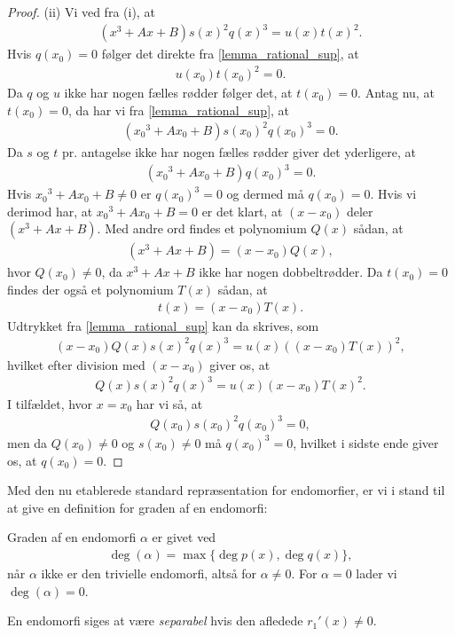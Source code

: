 \begin{proof}
(ii) Vi ved fra (i), at 
\begin{align}
	\label{lemma_rational_sup}
	(x^3 + Ax + B)s(x)^2 q(x)^3 = u(x) t(x)^2.
\end{align}
Hvis $q(x_0) = 0$ følger det direkte fra \eqref{lemma_rational_sup}, at 
\begin{align*}
	u(x_0)t(x_0)^2 = 0.
\end{align*}
Da $q$ og $u$ ikke har nogen fælles rødder følger det, at $t(x_0) = 0$. Antag nu, at $t(x_0)=0$, da har vi fra
\eqref{lemma_rational_sup}, at
\begin{align*}
	({x_0}^3 + Ax_0 + B)s(x_0)^2 q(x_0)^3 = 0.
\end{align*}
Da $s$ og $t$ pr. antagelse ikke har nogen fælles rødder giver det yderligere, at 
\begin{align*}
	({x_0}^3 + Ax_0 + B)q(x_0)^3 = 0.
\end{align*}
Hvis ${x_0}^3 + Ax_0 + B \neq 0$ er $q(x_0)^3 = 0$ og dermed må $q(x_0) = 0$. Hvis vi derimod har, at 
${x_0}^3 + Ax_0 + B = 0$ er det klart, at $(x-x_0)$ deler $(x^3 + Ax + B)$. Med andre ord findes et polynomium $Q(x)$ sådan, at
\begin{align*}
	(x^3 + Ax + B) = (x-x_0)Q(x),
\end{align*}
hvor $Q(x_0) \neq 0$, da $x^3 + Ax + B$ ikke har nogen dobbeltrødder. Da $t(x_0)=0$ findes der også et polynomium $T(x)$ sådan, at
\begin{align*}
	t(x) = (x-x_0)T(x).
\end{align*}
Udtrykket fra \eqref{lemma_rational_sup} kan da skrives, som
\begin{align*}
	(x-x_0)Q(x)s(x)^2q(x)^3 = u(x) ((x-x_0)T(x))^2,
\end{align*}
hvilket efter division med $(x-x_0)$ giver os, at
\begin{align*}
	Q(x)s(x)^2 q(x)^3 =  u(x) (x-x_0) T(x)^2.
\end{align*}
I tilfældet, hvor $x=x_0$ har vi så, at
\begin{align*}
	Q(x_0)s(x_0)^2q(x_0)^3 = 0,
\end{align*}
men da $Q(x_0) \neq 0$ og $s(x_0) \neq 0$ må $q(x_0)^3 = 0$, hvilket i sidste ende giver os, at $q(x_0)=0$.
\end{proof}
Med den nu etablerede standard repræsentation for endomorfier, er vi i stand til at give en definition for graden af en endomorfi:

\begin{definition}
Graden af en endomorfi $\alpha$ er givet ved
\begin{align*}
	\deg(\alpha) = \max \{ \deg p(x), \deg q(x) \},
\end{align*}
når $\alpha$ ikke er den trivielle endomorfi, altså for $\alpha \neq 0$. For $\alpha = 0$ lader vi $\deg (\alpha) = 0$.
\end{definition}
En endomorfi siges at være \textit{separabel} hvis den afledede $r_1'(x) \neq 0$.

